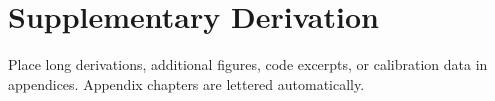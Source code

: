\chapter{Supplementary Derivation}
\label{app:derivation}

Place long derivations, additional figures, code excerpts, or calibration data
in appendices. Appendix chapters are lettered automatically.
